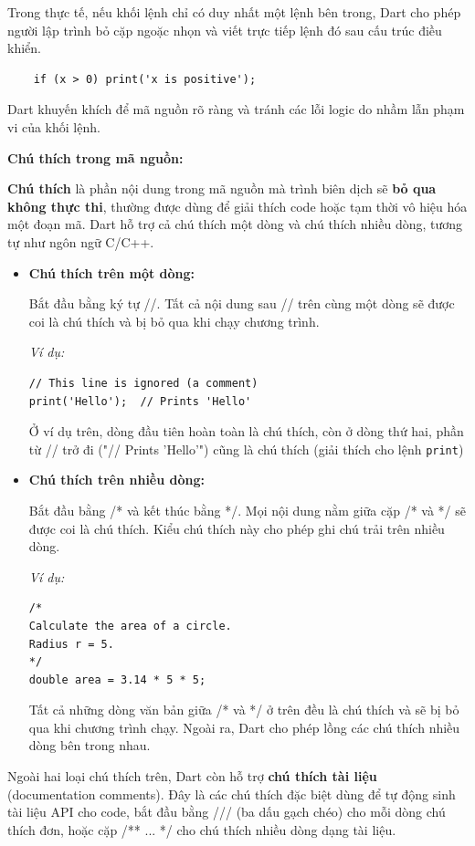 \documentclass[../DoAn.tex]{subfiles}
\numberwithin{figure}{chapter}
\begin{document}
Trong thực tế, nếu khối lệnh chỉ có duy nhất một lệnh bên trong, Dart cho phép người lập trình bỏ cặp ngoặc nhọn và viết trực tiếp lệnh đó sau cấu trúc điều khiển.
\begin{lstlisting}
    if (x > 0) print('x is positive');
\end{lstlisting}

Dart khuyến khích để mã nguồn rõ ràng và tránh các lỗi logic do nhầm lẫn phạm vi của khối lệnh.

\textbf{Chú thích trong mã nguồn:} 

\textbf{Chú thích} là phần nội dung trong mã nguồn mà trình biên dịch sẽ \textbf{bỏ qua không thực thi}, thường được dùng để giải thích code hoặc tạm thời vô hiệu hóa một đoạn mã. Dart hỗ trợ cả chú thích một dòng và chú thích nhiều dòng, tương tự như ngôn ngữ C/C++. 

\begin{itemize}
\item \textbf{Chú thích trên một dòng:} 
    
Bắt đầu bằng ký tự //. Tất cả nội dung sau // trên cùng một dòng sẽ được coi là chú thích và bị bỏ qua khi chạy chương trình. 

\textit{Ví dụ:}
\begin{lstlisting}
// This line is ignored (a comment)
print('Hello');  // Prints 'Hello'
\end{lstlisting}
Ở ví dụ trên, dòng đầu tiên hoàn toàn là chú thích, còn ở dòng thứ hai, phần từ // trở đi ("// Prints 'Hello'") cũng là chú thích (giải thích cho lệnh \texttt{print})

 \item \textbf{Chú thích trên nhiều dòng: } 
 
 Bắt đầu bằng /* và kết thúc bằng */. Mọi nội dung nằm giữa cặp /* và */ sẽ được coi là chú thích. Kiểu chú thích này cho phép ghi chú trải trên nhiều dòng. 
 
\textit{Ví dụ:}
\begin{lstlisting}
/* 
Calculate the area of a circle.
Radius r = 5.
*/
double area = 3.14 * 5 * 5;
\end{lstlisting}

Tất cả những dòng văn bản giữa /* và */ ở trên đều là chú thích và sẽ bị bỏ qua khi chương trình chạy. 
Ngoài ra, Dart cho phép lồng các chú thích nhiều dòng bên trong nhau.

\end{itemize}

Ngoài hai loại chú thích trên, Dart còn hỗ trợ \textbf{chú thích tài liệu} (documentation comments). Đây là các chú thích đặc biệt dùng để tự động sinh tài liệu API cho code, bắt đầu bằng /// (ba dấu gạch chéo) cho mỗi dòng chú thích đơn, hoặc cặp /** ... */ cho chú thích nhiều dòng dạng tài liệu. 
\end{document}
